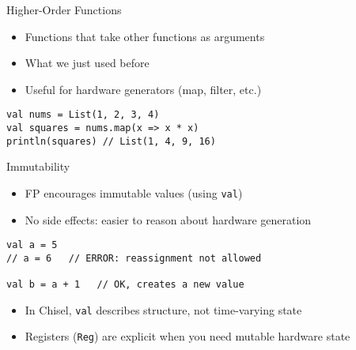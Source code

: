 \begin{frame}[fragile]{Higher-Order Functions}
\begin{itemize}
    \item Functions that take other functions as arguments
    \item What we just used before
    \item Useful for hardware generators (map, filter, etc.)
\end{itemize}

\begin{verbatim}
val nums = List(1, 2, 3, 4)
val squares = nums.map(x => x * x)
println(squares) // List(1, 4, 9, 16)
\end{verbatim}

%
\end{frame}

\begin{frame}[fragile]{Immutability}
\begin{itemize}
    \item FP encourages immutable values (using \texttt{val})
    \item No side effects: easier to reason about hardware generation
\end{itemize}

\begin{verbatim}
val a = 5
// a = 6   // ERROR: reassignment not allowed

val b = a + 1   // OK, creates a new value
\end{verbatim}

\begin{itemize}
    \item In Chisel, \texttt{val} describes structure, not time-varying state
    \item Registers (\texttt{Reg}) are explicit when you need mutable hardware state
\end{itemize}
\end{frame}

